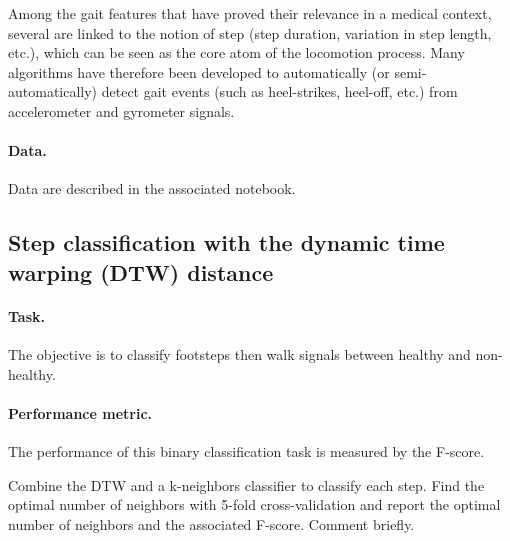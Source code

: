 \documentclass[11pt]{article}
\begin{document}
Among the gait features that have proved their relevance in a medical context, several are linked to the notion of step (step duration, variation in step length, etc.), which can be seen as the core atom of the locomotion process. Many algorithms have therefore been developed to automatically (or semi-automatically) detect gait events (such as heel-strikes, heel-off, etc.) from accelerometer and gyrometer signals.

\paragraph{Data.}
Data are described in the associated notebook.

\subsection{Step classification with the dynamic time warping (DTW) distance}

\paragraph{Task.} The objective is to classify footsteps then walk signals between healthy and non-healthy.

\paragraph{Performance metric.} The performance of this binary classification task is measured by the F-score.


\begin{exercise}
Combine the DTW and a k-neighbors classifier to classify each step. Find the optimal number of neighbors with 5-fold cross-validation and report the optimal number of neighbors and the associated F-score. Comment briefly.
\end{exercise}

\end{document}
